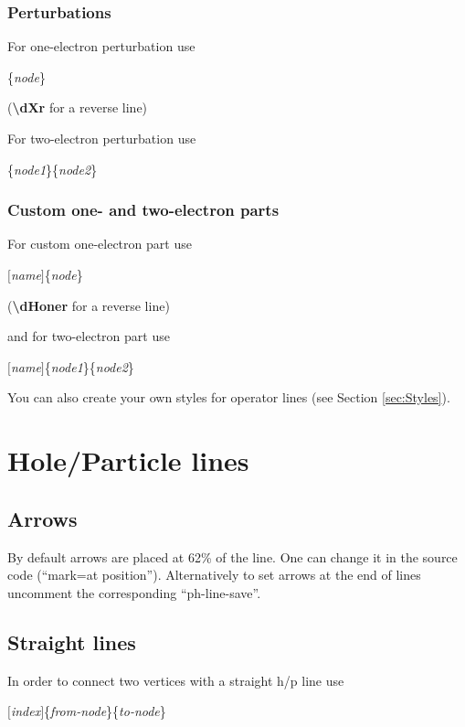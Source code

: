 \documentclass[a4paper]{article}
\newcommand{\myind}{\hspace{10pt}}
\begin{document}
\subsubsection{Perturbations}

For one-electron perturbation use

\myind{\bf \textbackslash dX}\{{\it node}\}

({\bf \textbackslash dXr} for a reverse line)

For two-electron perturbation use

\myind{\bf \textbackslash dXtwo}\{{\it node1}\}\{{\it node2}\}


\subsubsection{Custom one- and two-electron parts}

For custom one-electron part use

\myind{\bf \textbackslash dHone}$[${\it name}$]$\{{\it node}\}

({\bf \textbackslash dHoner} for a reverse line)

and for two-electron part use

\myind{\bf \textbackslash dHtwo}$[${\it name}$]$\{{\it node1}\}\{{\it node2}\}

You can also create your own styles for operator lines (see Section \ref{sec:Styles}).

\section{Hole/Particle lines}

\subsection{Arrows}

By default arrows are placed at 62\% of the line. One can change it in the source code 
(``mark=at position'').
Alternatively to set arrows at the end of lines uncomment the corresponding ``ph-line-save''.

\subsection{Straight lines}

In order to connect two vertices with a straight h/p line use

\myind{\bf \textbackslash dline}$[${\it index}$]$\{{\it from-node}\}\{{\it to-node}\}
\end{document}
